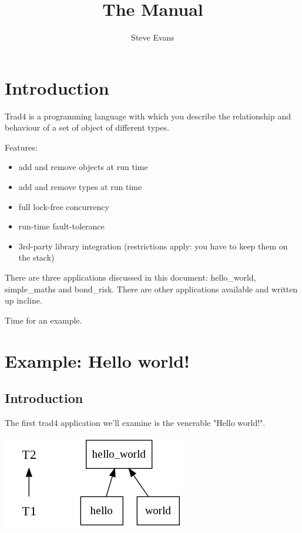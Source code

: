 \documentclass{report}
\begin{document}
\title{The Manual}
\author{Steve Evans}
\maketitle

\setcounter{tocdepth}{1}
\tableofcontents

\chapter{Introduction}

Trad4 is a programming language with which you describe the relationship and behaviour of a set of object of different types. 

Features:

\begin{itemize}
\item add and remove objects at run time
\item add and remove types at run time
\item full lock-free concurrency
\item run-time fault-tolerance
\item 3rd-party library integration (restrictions apply: you have to keep them on the stack)
\end{itemize}

There are three applications discussed in this document: hello_world, simple_maths and bond_risk. There are other applications available and written up incline.

Time for an example.

\chapter{Example: Hello world!}

\section{Introduction}

The first trad4 application we'll examine is the venerable "Hello world!".

\includegraphics[scale=0.5]{helloworldabstract.png}
\end{document}
